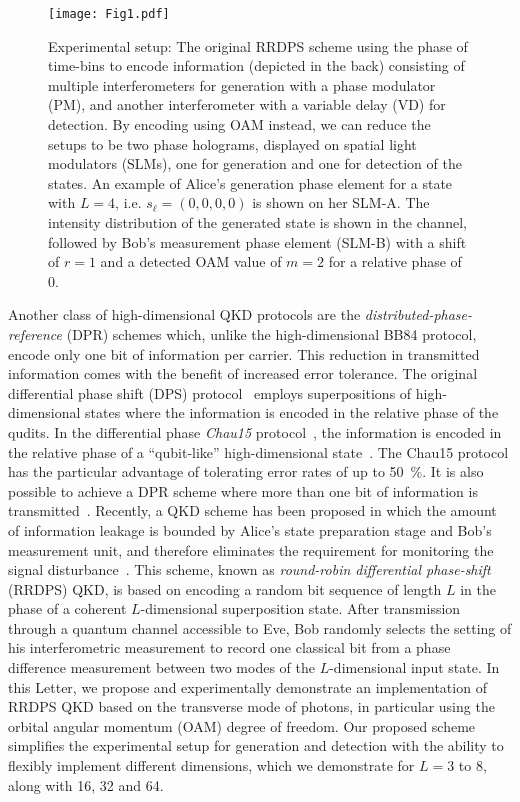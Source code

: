 \documentclass[twocolumn,aps,prl,floatfix,superscriptaddress]{revtex4-1}
\begin{document}
\begin{figure*}[t]
	\begin{center}
	\texttt{[image: Fig1.pdf]}
	\caption[]{Experimental setup: The original RRDPS scheme using the phase of time-bins to encode information (depicted in the back) consisting of multiple interferometers for generation with a phase modulator (PM), and another interferometer with a variable delay (VD) for detection. By encoding using OAM instead, we can reduce the setups to be two phase holograms, displayed on spatial light modulators (SLMs), one for generation and one for detection of the states. An example of Alice's generation phase element for a state with $L=4$, i.e. $s_\ell=(0,0,0,0)$ is shown on her SLM-A. The intensity distribution of the generated state is shown in the channel, followed by Bob's measurement phase element (SLM-B) with a shift of $r=1$ and a detected OAM value of $m=2$ for a relative phase of 0.}%
	\label{fig:setup}
	\end{center}
\end{figure*}

Another class of high-dimensional QKD protocols are the \emph{distributed-phase-reference} (DPR) schemes which, unlike the high-dimensional BB84 protocol, encode only one bit of information per carrier. This reduction in transmitted information comes with the benefit of increased error tolerance. The original differential phase shift (DPS) protocol~\cite{inoue:02} employs superpositions of high-dimensional states where the information is encoded in the relative phase of the qudits. In the differential phase \emph{Chau15} protocol~\cite{chau:15,chau:17}, the information is encoded in the relative phase of a ``qubit-like'' high-dimensional state~\cite{wang:17}. The Chau15 protocol has the particular advantage of tolerating error rates of up to 50~\%. It is also possible to achieve a DPR scheme where more than one bit of information is transmitted~\cite{bacco:16}. Recently, a QKD scheme has been proposed in which the amount of information leakage is bounded by Alice's state preparation stage and Bob's measurement unit, and therefore eliminates the requirement for monitoring the signal disturbance~\cite{sasaki:14}. This scheme, known as \emph{round-robin differential phase-shift} (RRDPS) QKD, is based on encoding a random bit sequence of length $L$ in the phase of a coherent $L$-dimensional superposition state. After transmission through a quantum channel accessible to Eve, Bob randomly selects the setting of his interferometric measurement to record one classical bit from a phase difference measurement between two modes of the $L$-dimensional input state. In this Letter, we propose and experimentally demonstrate an implementation of RRDPS QKD based on the transverse mode of photons, in particular using the orbital angular momentum (OAM) degree of freedom. Our proposed scheme simplifies the experimental setup for generation and detection with the ability to flexibly implement different dimensions, which we demonstrate for $L=3$ to 8, along with 16, 32 and 64. 
\end{document}
